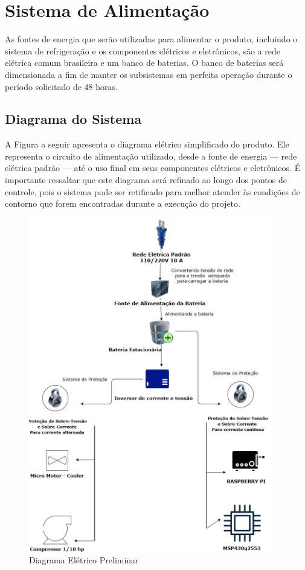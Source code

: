 \section{Sistema de Alimentação}
As fontes de energia que serão utilizadas para alimentar o produto, incluindo o sistema de refrigeração e os componentes elétricos e eletrônicos, são a rede elétrica comum brasileira e um banco de baterias. O banco de baterias será dimensionada a fim de manter os subsistemas em perfeita operação durante o período solicitado de 48 horas.

\subsection{Diagrama do Sistema}
A Figura a seguir apresenta o diagrama elétrico simplificado do produto. Ele representa o circuito de alimentação utilizado, desde a fonte de energia --- rede elétrica padrão --- até o uso final em seus componentes elétricos e eletrônicos.  É importante ressaltar que este diagrama será refinado ao longo dos pontos de controle, pois o  sistema pode ser retificado para melhor atender às condições de contorno que forem encontradas durante a execução do projeto.

\begin{figure}[H]
\begin{center}
\includegraphics[scale = 1.2]{figuras/Diagrama_Simp.JPG}
\caption{ Diagrama Elétrico Preliminar}
\end{center}
\end{figure}

